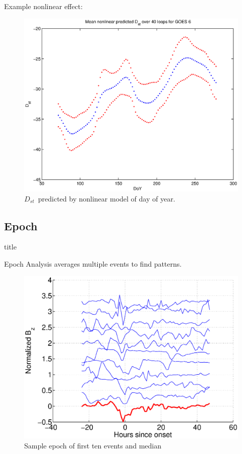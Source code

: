 \documentclass[xcolor={dvipsnames,table}]{beamer}
\newcommand{\subheader}{    		\begin{center}
  	\begin{beamercolorbox}[sep=4pt,center,shadow=true,rounded=true]{title}
  		\usebeamerfont{title}\subsecname\par%
  	\end{beamercolorbox}
  	\vfill
  	\end{center}}
\newcommand{\dst}{\ensuremath{D_{st}}} %
\begin{document}
\begin{frame}
	Example nonlinear effect:
	\begin{figure}[htp!]
		\centering
		\includegraphics[width=0.7\linewidth]{Figures/NNDoY-Dst-GOES6}	
		\caption{\dst\ predicted by nonlinear model of day of year.}
		\label{fig:DoYDst}
	\end{figure}
\end{frame}




\subsection{Epoch}
\begin{frame}
	\subheader
	Epoch Analysis averages multiple events to find patterns.
\begin{figure}
\includegraphics[scale=0.3]{Figures/epochexample}
\caption{Sample epoch of first ten events and median}
\label{fig:epochexample}
\end{figure}
\end{frame}
\end{document}
